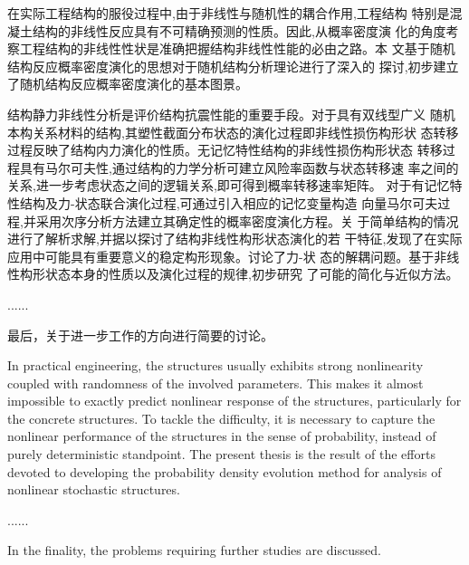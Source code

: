 
\begin{cabstract}
在实际工程结构的服役过程中,由于非线性与随机性的耦合作用,工程结构
特别是混凝土结构的非线性反应具有不可精确预测的性质。因此,从概率密度演
化的角度考察工程结构的非线性性状是准确把握结构非线性性能的必由之路。本
文基于随机结构反应概率密度演化的思想对于随机结构分析理论进行了深入的
探讨,初步建立了随机结构反应概率密度演化的基本图景。

结构静力非线性分析是评价结构抗震性能的重要手段。对于具有双线型广义
随机本构关系材料的结构,其塑性截面分布状态的演化过程即非线性损伤构形状
态转移过程反映了结构内力演化的性质。无记忆特性结构的非线性损伤构形状态
转移过程具有马尔可夫性,通过结构的力学分析可建立风险率函数与状态转移速
率之间的关系,进一步考虑状态之间的逻辑关系,即可得到概率转移速率矩阵。
对于有记忆特性结构及力-状态联合演化过程,可通过引入相应的记忆变量构造
向量马尔可夫过程,并采用次序分析方法建立其确定性的概率密度演化方程。关
于简单结构的情况进行了解析求解,并据以探讨了结构非线性构形状态演化的若
干特征,发现了在实际应用中可能具有重要意义的稳定构形现象。讨论了力-状
态的解耦问题。基于非线性构形状态本身的性质以及演化过程的规律,初步研究
了可能的简化与近似方法。

......

最后，关于进一步工作的方向进行简要的讨论。

\end{cabstract}



\begin{eabstract}
In practical engineering, the structures usually exhibits strong nonlinearity
coupled with randomness of the involved parameters. This makes it almost impossible
to exactly predict nonlinear response of the structures, particularly for the concrete
structures. To tackle the difficulty, it is necessary to capture the nonlinear performance
of the structures in the sense of probability, instead of purely deterministic standpoint.
The present thesis is the result of the efforts devoted to developing the probability
density evolution method for analysis of nonlinear stochastic structures.

......

In the finality, the problems requiring further studies are discussed.
\end{eabstract}

